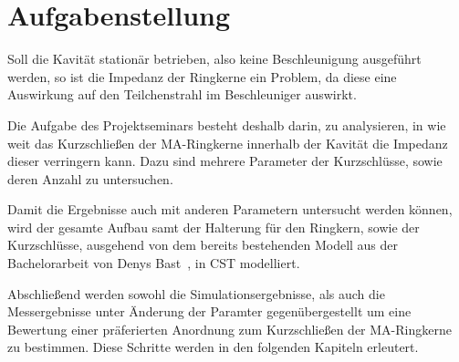 \section{Aufgabenstellung}
Soll die Kavit\"at station\"ar betrieben, also keine Beschleunigung ausgef\"uhrt werden, so ist die Impedanz der Ringkerne ein Problem, da diese eine Auswirkung auf den Teilchenstrahl im Beschleuniger auswirkt.
\par
Die Aufgabe des Projektseminars besteht deshalb darin, zu analysieren, in wie weit das Kurzschlie\ss{}en der MA-Ringkerne innerhalb der Kavit\"at die Impedanz dieser verringern kann. Dazu sind mehrere Parameter der Kurzschl\"usse, sowie deren Anzahl zu untersuchen.
\par
Damit die Ergebnisse auch mit anderen Parametern untersucht werden k\"onnen, wird der gesamte Aufbau samt der Halterung f\"ur den Ringkern, sowie der Kurzschl\"usse, ausgehend von dem bereits bestehenden Modell aus der Bachelorarbeit von Denys Bast~\cite{bast2017ba}, in CST modelliert. 
\par
Abschlie\ss{}end werden sowohl die Simulationsergebnisse, als auch die Messergebnisse unter \"Anderung der Paramter gegen\"ubergestellt um eine Bewertung einer pr\"aferierten Anordnung zum Kurzschlie\ss{}en der MA-Ringkerne zu bestimmen. Diese Schritte werden in den folgenden Kapiteln erleutert. 